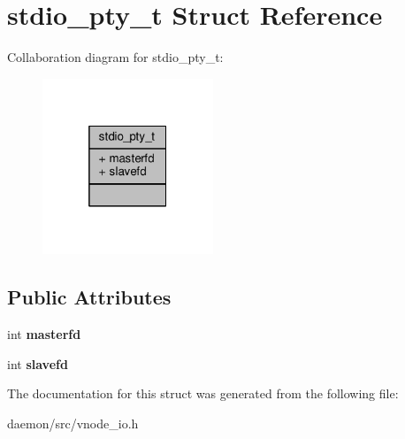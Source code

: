\hypertarget{structstdio__pty__t}{\section{stdio\+\_\+pty\+\_\+t Struct Reference}
\label{structstdio__pty__t}
}


Collaboration diagram for stdio\+\_\+pty\+\_\+t\+:
\nopagebreak
\begin{figure}[H]
\begin{center}
\leavevmode
\includegraphics[width=145pt]{structstdio__pty__t__coll__graph}
\end{center}
\end{figure}
\subsection*{Public Attributes}
\begin{DoxyCompactItemize}
\item 
\hypertarget{structstdio__pty__t_a9dda465da0140d5268d3bdf62f85ad3a}{int {\bfseries masterfd}}\label{structstdio__pty__t_a9dda465da0140d5268d3bdf62f85ad3a}

\item 
\hypertarget{structstdio__pty__t_ae5bfbc20ba9daaea4b396dc5a641b33c}{int {\bfseries slavefd}}\label{structstdio__pty__t_ae5bfbc20ba9daaea4b396dc5a641b33c}

\end{DoxyCompactItemize}


The documentation for this struct was generated from the following file\+:\begin{DoxyCompactItemize}
\item 
daemon/src/vnode\+\_\+io.\+h\end{DoxyCompactItemize}

